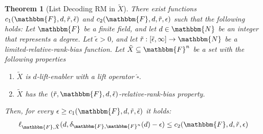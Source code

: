 \documentclass[10pt,a4paper]{article}
\newtheorem{theorem}{Theorem}[section]
\newcommand{\basefield}[0]{\mathbbm{F}}
\newcommand{\blocklength}[0]{n}
\newcommand{\field}[0]{\basefield^{\blocklength}}
\newcommand{\degree}[0]{d}
\newcommand{\funcdef}[3]{#1:#2\rightarrow#3}
\newcommand{\naturalnumbersset}[0]{\mathbbm{N}}
\newcommand{\variety}{{\tilde{X}}}
\newcommand{\lift}[1]{\widehat{#1}}
\newcommand{\rankbiasfunc}[0]{{\tilde{r}}}
\newcommand{\epsilonlimitedrankbias}[0]{{\tilde{\epsilon}}}
\newcommand{\listpolycount}[4]{\ell_{#1, #2}(#3, #4)}
\newcommand{\normalizedcodedistanceex}[3]{\delta_{#1, #2}(#3)}
\begin{document}
\begin{theorem}[List Decoding RM in $\variety$]\label{thm:list-decoding-RM-in-X}
    There exist functions $c_1(\basefield, \degree, \rankbiasfunc, \epsilonlimitedrankbias)$ and $c_2(\basefield, \degree, \rankbiasfunc, \epsilon)$ such that the following holds:
    Let $\basefield$ be a finite field, and let $\degree \in \naturalnumbersset$ be an integer that represents a degree.
    Let $\epsilonlimitedrankbias > 0$, and let $\funcdef{\rankbiasfunc}{[\epsilonlimitedrankbias, \infty]}{\naturalnumbersset}$ be a limited-relative-rank-bias function.
    \newline
    Let $\variety \subseteq \field$ be a set with the following properties
    \begin{enumerate}
        \item $\variety$ is $\degree$-lift-enabler with a lift operator $\lift{\square}$.
        \item $\variety$ has the $(\rankbiasfunc, \basefield, \degree, \epsilonlimitedrankbias)$-relative-rank-bias property.
    \end{enumerate}
    Then, for every $\epsilon \geq c_1(\basefield, \degree, \rankbiasfunc, \epsilonlimitedrankbias)$ it holds:
    \[
        \listpolycount{\basefield}{\variety}{\degree}{\normalizedcodedistanceex{\basefield}{\field}{\degree} - \epsilon} \leq
        c_2(\basefield, \degree, \rankbiasfunc, \epsilon)
    \]
\end{theorem}
\end{document}
